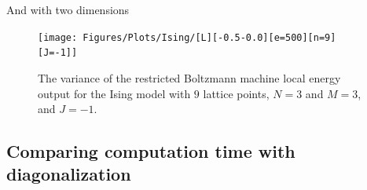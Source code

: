 And with two dimensions

\begin{figure}[H]
  \begin{center}
    \texttt{[image: Figures/Plots/Ising/[L][-0.5-0.0][e=500][n=9][J=-1]]}
  \end{center}
  \caption{The variance of the restricted Boltzmann machine local energy output for the Ising model with $9$ lattice points, $N=3$ and $M=3$, and $J=-1$.}
\end{figure}

\subsection{Comparing computation time with diagonalization}
